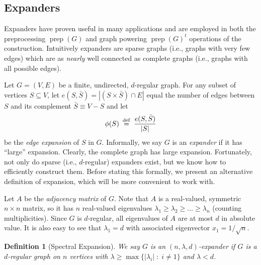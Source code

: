 \documentclass{article}
\newtheorem{definition}[theorem]{Definition}
\newcommand{\prep}{{\operatorname{prep}}}
\newcommand{\eqdef}{\mathbin{\stackrel{\rm def}{=}}}
\begin{document}
\subsection{Expanders}

Expanders have proven useful in many applications
and are employed in both the preprocessing $\prep(G)$ and graph powering $\prep(G)^t$ operations
of the construction.
Intuitively expanders are sparse graphs (i.e., graphs with very few edges)
which are as \emph{nearly} well connected as complete graphs (i.e., graphs with all possible edges).

Let $G = (V, E)$ be a finite, undirected, $d$-regular graph.
For any subset of vertices $S \subseteq V$,
let $e(S, \bar{S}) = |(S\times \bar{S})\cap E|$ equal the number of edges
between $S$ and its complement $\bar{S} \equiv V - S$ and
let
\begin{align*}
\phi(S) \;\eqdef\; \frac{e(S, \bar{S})}{|S|} %
\end{align*}
be the \emph{edge expansion} of $S$ in $G$.
Informally, we say $G$ is an \emph{expander} if it has ``large'' expansion.
Clearly, the complete graph has large expansion.
Fortunately, not only do sparse (i.e., $d$-regular) expanders exist,
but we know how to efficiently construct them.
Before stating this formally, we present an alternative definition of
expansion, which will be more convenient to work with.

Let $A$ be the \emph{adjacency matrix} of $G$.
Note that $A$ is a real-valued, symmetric $n \times n$ matrix,
so it has $n$ real-valued eigenvalues $\lambda_1 \ge \lambda_2 \ge \dots \ge \lambda_n$
(counting multiplicities).
Since $G$ is $d$-regular, all eigenvalues of $A$ are at most $d$ in absolute value.
It is also easy to see that $\lambda_1=d$ with associated
eigenvector $x_1 = 1/\sqrt{n}$.

\begin{definition}[Spectral Expansion]
We say $G$ is an $(n, \lambda, d)$-expander if $G$ is a $d$-regular graph
on $n$ vertices with $\lambda \ge \max \{|\lambda_i| \;:\; i \neq 1\}$
and $\lambda < d$.
\end{definition}
\end{document}
